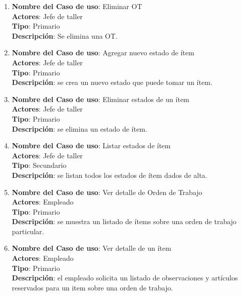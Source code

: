 \documentclass[12pt]{extarticle}
\begin{document}
\begin{spacing}{1.2}
\begin{enumerate}
        \item 	\textbf{Nombre del Caso de uso}: Eliminar OT\\
                \textbf{Actores}: Jefe de taller\\
                \textbf{Tipo}: Primario\\
                \textbf{Descripción}: Se elimina una OT.

        \item 	\textbf{Nombre del Caso de uso}: Agregar nuevo estado de ítem\\
                \textbf{Actores}: Jefe de taller\\
                \textbf{Tipo}: Primario\\
                \textbf{Descripción}: se crea un nuevo estado que puede tomar un ítem.

        \item 	\textbf{Nombre del Caso de uso}: Eliminar estados de un ítem\\
                \textbf{Actores}: Jefe de taller\\
                \textbf{Tipo}: Primario\\
                \textbf{Descripción}: se elimina un estado de ítem.
        
        \item 	\textbf{Nombre del Caso de uso}: Listar estados de ítem\\
                \textbf{Actores}: Jefe de taller\\
                \textbf{Tipo}: Secundario\\
                \textbf{Descripción}: se listan todos los estados de ítem dados de alta.

        \item 	\textbf{Nombre del Caso de uso}: Ver detalle de Orden de Trabajo\\
                \textbf{Actores}: Empleado\\
                \textbf{Tipo}: Primario\\
                \textbf{Descripción}: se muestra un listado de ítems sobre una orden de trabajo particular.

        \item 	\textbf{Nombre del Caso de uso}: Ver detalle de un ítem\\
                \textbf{Actores}: Empleado\\
                \textbf{Tipo}: Primario\\
                \textbf{Descripción}: el empleado solicita un listado de observaciones y artículos reservados para un item sobre una orden de trabajo.




\end{enumerate}
\end{spacing}
\end{document}

